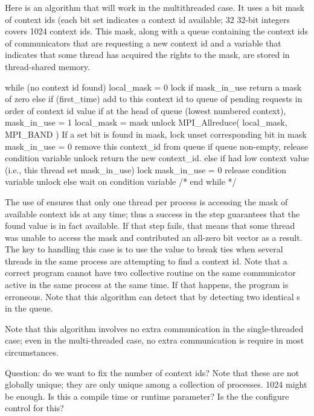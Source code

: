 \documentclass{article}
\begin{document}
Here is an algorithm that will work in the multithreaded case.  It
uses a bit mask of context ids (each bit set indicates a context id
available; 32 32-bit integers covers 1024 context ids.  This mask,
along with a queue containing the context ids of communicators that
are requesting a new context id and a variable that indicates that
some thread has acquired the rights to the mask, are stored in
thread-shared memory.
\begin{algorithm}
while (no context id found) {
    local_mask = 0
    lock 
    if mask_in_use return a mask of zero
    else if (first_time) add to this context id to queue of pending
    requests in order of context id value
    if at the head of queue (lowest numbered context), 
        mask_in_use = 1
        local_mask = mask
    unlock
    MPI_Allreduce( local_mask, MPI_BAND )
    If a set bit is found in mask,
        lock
        unset corresponding bit in mask
        mask_in_use = 0
        remove this context_id from queue
        if queue non-empty, release condition variable
        unlock
        return the new context_id.
    else if had low context value (i.e., this thread set mask_in_use)
        lock
        mask_in_use = 0
        release condition variable
        unlock
    else
        wait on condition variable
    } /* end while */
\end{algorithm}
The use of  ensures that only one thread per process
is accessing the mask of available context ids at any time; thus a
success in the  step guarantees that the found
value is in fact available.  If that step fails, that means that some
thread was unable to access the mask and contributed an all-zero bit
vector as a result.  
The key to handling this case is to use the
 value to break ties when several threads
in the same process are attempting to find a context id.  Note that a
correct program cannot have two collective routine on the same
communicator active in the same process at the same time.  If that
happens, the program is erroneous.  Note that this algorithm can
detect that by detecting two identical s in the
queue.

Note that this algorithm involves no extra communication in the
single-threaded case; even in the multi-threaded case, no extra
communication is require in most circumstances.

Question: do we want to fix the number of context ids?  Note that
these are not globally unique; they are only unique among a collection
of processes.  1024 might be enough.  Is this a compile time or
runtime parameter?  Is the  the configure
control for this?
\end{document}
